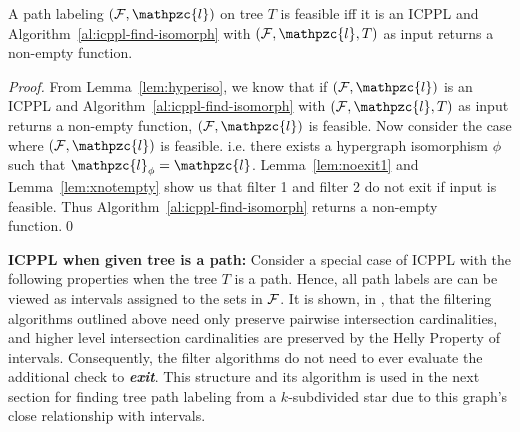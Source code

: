 \documentclass[11pt,
               envcountsect,
               envcountsame]
               {../lib/llncs2e/llncs}
\def\cF{{\cal F}}
\def\cl{\mathpzc{l}}
\def\xnoindent{\noindent} %
\begin{document}
\begin{theorem}
  \label{th:charac}
  A path labeling $(\cF, \cl)$ on tree $T$ is feasible iff it is an
  ICPPL and Algorithm~\ref{al:icppl-find-isomorph} with $(\cF, \cl,
  T)$ as input returns a non-empty function.
\end{theorem}
\begin{proof}
  From Lemma~\ref{lem:hyperiso}, we know that if $(\cF, \cl)$ is an
  ICPPL and Algorithm~\ref{al:icppl-find-isomorph} with $(\cF, \cl,
  T)$ as input returns a non-empty function, $(\cF, \cl)$ is feasible.
  Now consider the case where $(\cF, \cl)$ is feasible. i.e. there
  exists a hypergraph isomorphism $\phi$ such that $\cl_\phi =
  \cl$. Lemma~\ref{lem:noexit1} and Lemma~\ref{lem:xnotempty} show us
  that filter 1 and filter 2 do not exit if input is feasible. Thus
  Algorithm~\ref{al:icppl-find-isomorph} returns a non-empty function.\qed
\end{proof}

\noindent
{\bf ICPPL when given tree is a path:}
\label{subsec:icpplicpia}
\xnoindent
Consider a special case of ICPPL with the following properties when the tree $T$
is a path.  Hence, all path labels are can be viewed as intervals assigned to the
sets in $\cF$.  It is shown, in \cite{nsnrs09}, that the filtering algorithms outlined
above need only preserve pairwise intersection cardinalities, and higher level
intersection cardinalities are preserved by the Helly Property of intervals.  Consequently,
the filter algorithms do not need to ever evaluate the additional check to {\em \bf exit}.
This structure and its algorithm is
used in the next section for finding tree path labeling from a
$k$-subdivided star due to this graph's close relationship with
intervals. 
\end{document}
